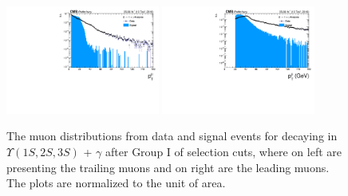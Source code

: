 \begin{figure}[!htbp]
\begin{center}
\includegraphics[width=0.45\textwidth]{figures_and_tables/outputPlots/ZtoUpsilon_Cat0_ZZZZZ/au/data_x_mc/noKinCuts/h_noKin_TrailingMu_pt}\hspace*{1.cm}
\includegraphics[width=0.45\textwidth]{figures_and_tables/outputPlots/ZtoUpsilon_Cat0_ZZZZZ/au/data_x_mc/noKinCuts/h_noKin_LeadingMu_pt}
\end{center}\vspace*{-.5cm}
\caption{The \PT muon distributions from data and signal events for \Z decaying in $\Upsilon(1S,2S,3S)$ + $\gamma$ after Group I of selection cuts, where on left are presenting the trailing muons and on right are the leading muons. The plots are normalized to the unit of area.}
\label{fig:pTMuons_ZtoUpsilon_Cat0}
\end{figure}



